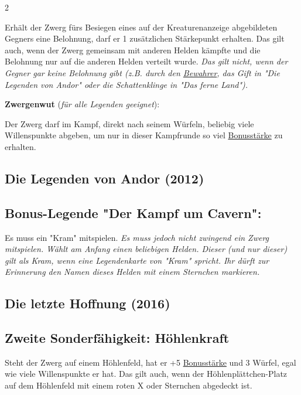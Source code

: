 \documentclass[10pt, a4paper, oneside]{book}
\newcommand{\fan}[1]{\textit{#1}}
\begin{document}
\begin{multicols*}{2}
\begin{nobgcolor}
Erhält der Zwerg fürs Besiegen eines auf der Kreaturenanzeige abgebildeten Gegners eine Belohnung, darf er 1 zusätzlichen Stärkepunkt erhalten. Das gilt auch, wenn der Zwerg gemeinsam mit anderen Helden kämpfte und die Belohnung nur auf die anderen Helden verteilt wurde.
\supercite{bgg-extrastaerke-zwerg}
\fan{Das gilt nicht, wenn der Gegner gar keine Belohnung gibt (z.B. durch den \hyperref[bewahrer]{Bewahrer}, das Gift in "Die Legenden von Andor" oder die Schattenklinge in "Das ferne Land").}

\bullet{} \textbf{Zwergenwut} (\fan{für alle Legenden geeignet}):

Der Zwerg darf im Kampf, direkt nach seinem Würfeln, beliebig viele Willenspunkte abgeben, um nur in dieser Kampfrunde so viel \hyperref[bonusstaerke]{Bonusstärke} zu erhalten. 
\supercite{gdk}


\end{nobgcolor}


\begin{bgcolor}
\section{Die Legenden von Andor (2012)}

\subsection{Bonus-Legende "Der Kampf um Cavern":}

Es muss ein "Kram" mitspielen.
\supercite{bl-kuc-a}
\fan{Es muss jedoch nicht zwingend ein Zwerg mitspielen. Wählt am Anfang einen beliebigen Helden. Dieser (und nur dieser) gilt als Kram, wenn eine Legendenkarte von "Kram" spricht. Ihr dürft zur Erinnerung den Namen dieses Helden mit einem Sternchen markieren.}


\end{bgcolor}


\begin{bgcolor}
\section{Die letzte Hoffnung (2016)}


\subsection{Zweite Sonderfähigkeit: Höhlenkraft}

Steht der Zwerg auf einem Höhlenfeld, hat er +5 \hyperref[bonusstaerke]{Bonusstärke} und 3 Würfel, egal wie viele Willenspunkte er hat.
\supercite{dlh-begleitheft,dlh11-heldenkarte-zwerg}
Das gilt auch, wenn der Höhlenplättchen-Platz auf dem Höhlenfeld mit einem roten X\supercite{dlh13-a} oder Sternchen\supercite{dlh15-a} abgedeckt ist.




\end{bgcolor}
\end{multicols*}
\end{document}
